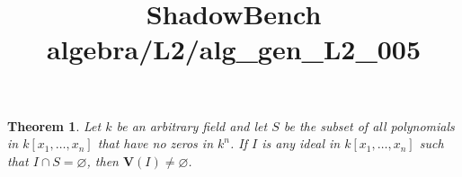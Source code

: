 \documentclass{article}
\title{ShadowBench algebra/L2/alg\_gen\_L2\_005}
\newtheorem{theorem}{Theorem}
\begin{document}
\maketitle

\begin{theorem}
Let $k$ be an arbitrary field and let $S$ be the subset of all polynomials in $k[x_1,\dots,x_n]$ that have no zeros in $k^n$. If $I$ is any ideal in $k[x_1,\dots,x_n]$ such that $I \cap S=\varnothing$, then $\mathbf V(I)\neq\varnothing$.
\end{theorem}
\end{document}
